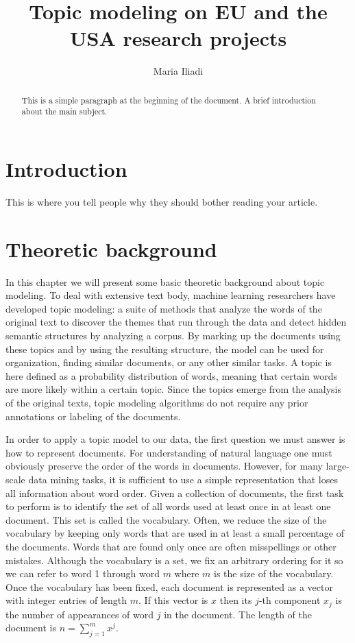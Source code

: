 \documentclass[12pt]{report}
\title{Topic modeling on EU and the USA research projects}
\author{Maria Iliadi}
\begin{document}
\maketitle
\tableofcontents


\begin{abstract}
This is a simple paragraph at the beginning of the document. 
A brief introduction about the main subject.
\end{abstract}


\section{Introduction}
This is where you tell people why they should bother reading your article.


\section{Theoretic background}

In this chapter we will present some basic theoretic background about topic
modeling. To deal with extensive text body, machine learning researchers have
developed topic modeling: a suite of methods that analyze the words of the
original text to discover the themes that run through the data and detect
hidden semantic structures by analyzing a corpus. By marking up the documents
using these topics and by using the resulting structure, the model can be used
for organization, finding similar documents, or any other similar tasks. A
topic is here defined as a probability distribution of words, meaning that
certain words are more likely within a certain topic. Since the topics emerge
from the analysis of the original texts, topic modeling algorithms do not
require any prior annotations or labeling of the documents.

In order to apply a topic model to our data, the first question we must answer
is how to represent documents. For understanding of natural language one must
obviously preserve the order of the words in documents. However, for many
large-scale data mining tasks, it is sufficient to use a simple representation
that loses all information about word order. Given a collection of documents,
the first task to perform is to identify the set of all words used at least
once in at least one document. This set is called the vocabulary. Often, we
reduce the size of the vocabulary by keeping only words that are used in at
least a small percentage of the documents. Words that are found only once are
often misspellings or other mistakes. Although the vocabulary is a set, we fix
an arbitrary ordering for it so we can refer to word 1 through word $m$ where
$m$ is the size of the vocabulary. Once the vocabulary has been fixed, each
document is represented as a vector with integer entries of length $m$. If this
vector is $x$ then its $j$-th component $x_j$ is the number of appearances of
word $j$ in the document. The length of the document is $n=\sum\limits_{j=1}^m
x^j$.
\end{document}
